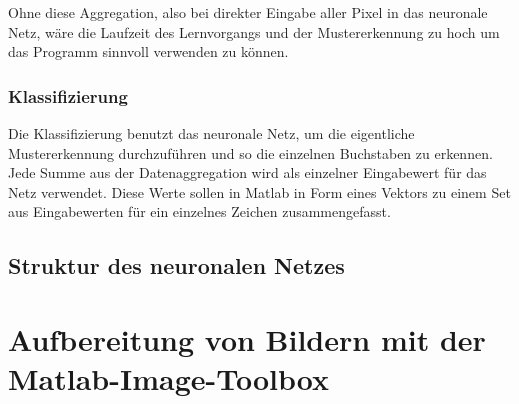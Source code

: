 Ohne diese Aggregation, also bei direkter Eingabe aller Pixel in das
neuronale Netz, wäre die Laufzeit des Lernvorgangs und der Mustererkennung zu
hoch um das Programm sinnvoll verwenden zu können.


\subsubsection{Klassifizierung}

Die Klassifizierung benutzt das neuronale Netz, um die eigentliche
Mustererkennung durchzuführen und so die einzelnen Buchstaben zu
erkennen. Jede Summe aus der Datenaggregation wird als einzelner Eingabewert
für das Netz verwendet. Diese Werte sollen in Matlab in Form eines Vektors zu
einem Set aus Eingabewerten für ein einzelnes Zeichen zusammengefasst.


\subsection{Struktur des neuronalen Netzes}

\section{Aufbereitung von Bildern mit der Matlab-Image-Toolbox}
